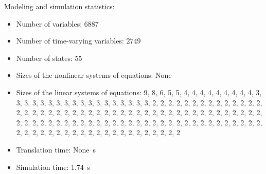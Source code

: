 \begin{contextbox}
  Modeling and simulation statistics:
  \begin{itemize}
    \item Number of variables: 6887
    \item Number of time-varying variables: 2749
    \item Number of states: 55
    \item Sizes of the nonlinear systems of equations: None
    \item Sizes of the linear systems of equations: 9, 8, 6, 5, 5, 4, 4, 4, 4, 4, 4, 4, 4, 4, 3, 3, 3, 3, 3, 3, 3, 3, 3, 3, 3, 3, 3, 3, 3, 3, 3, 3, 2, 2, 2, 2, 2, 2, 2, 2, 2, 2, 2, 2, 2, 2, 2, 2, 2, 2, 2, 2, 2, 2, 2, 2, 2, 2, 2, 2, 2, 2, 2, 2, 2, 2, 2, 2, 2, 2, 2, 2, 2, 2, 2, 2, 2, 2, 2, 2, 2, 2, 2, 2, 2, 2, 2, 2, 2, 2, 2, 2, 2, 2, 2, 2, 2, 2, 2, 2, 2, 2, 2, 2, 2, 2, 2, 2, 2, 2, 2, 2, 2, 2, 2, 2, 2, 2, 2, 2, 2, 2, 2, 2, 2, 2, 2, 2, 2
    \item Translation time: \SI{None}{s}
    \item Simulation time: \SI{1.74}{s}
  \end{itemize}
\end{contextbox}
